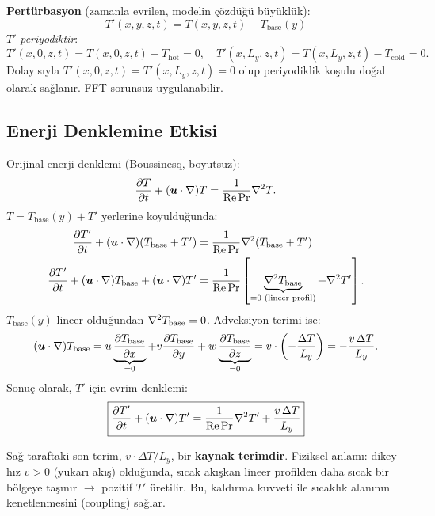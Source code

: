 \textbf{Pertürbasyon} (zamanla evrilen, modelin çözdüğü büyüklük):
\begin{equation}
    T'(x, y, z, t) = T(x, y, z, t) - T_{\text{base}}(y)
    \label{eq:T_perturbation}
\end{equation}
$T'$ \textit{periyodiktir}:
\[
    T'(x, 0, z, t) = T(x, 0, z, t) - T_{\text{hot}} = 0, \quad
    T'(x, L_y, z, t) = T(x, L_y, z, t) - T_{\text{cold}} = 0.
\]
Dolayısıyla $T'(x, 0, z, t) = T'(x, L_y, z, t) = 0$ olup periyodiklik koşulu doğal olarak sağlanır. FFT sorunsuz uygulanabilir.

\subsection{Enerji Denklemine Etkisi}

Orijinal enerji denklemi (Boussinesq, boyutsuz):
\begin{equation}
    \frac{\partial T}{\partial t} + (\bm{u} \cdot \nabla) T = \frac{1}{\mathrm{Re} \, \mathrm{Pr}} \nabla^2 T.
    \label{eq:energy_original}
\end{equation}
$T = T_{\text{base}}(y) + T'$ yerlerine koyulduğunda:
\begin{align}
    \frac{\partial T'}{\partial t} + (\bm{u} \cdot \nabla)(T_{\text{base}} + T')
    &= \frac{1}{\mathrm{Re} \, \mathrm{Pr}} \nabla^2 (T_{\text{base}} + T') \notag \\
    \frac{\partial T'}{\partial t} + (\bm{u} \cdot \nabla) T_{\text{base}} + (\bm{u} \cdot \nabla) T'
    &= \frac{1}{\mathrm{Re} \, \mathrm{Pr}} \left[ \underbrace{\nabla^2 T_{\text{base}}}_{=0 \text{ (lineer profil)}} + \nabla^2 T' \right]. \notag
\end{align}
$T_{\text{base}}(y)$ lineer olduğundan $\nabla^2 T_{\text{base}} = 0$. Adveksiyon terimi ise:
\begin{equation}
    (\bm{u} \cdot \nabla) T_{\text{base}}
    = u \underbrace{\frac{\partial T_{\text{base}}}{\partial x}}_{=0}
    + v \frac{\partial T_{\text{base}}}{\partial y}
    + w \underbrace{\frac{\partial T_{\text{base}}}{\partial z}}_{=0}
    = v \cdot \left(-\frac{\Delta T}{L_y}\right)
    = -\frac{v \, \Delta T}{L_y}.
\end{equation}
Sonuç olarak, $T'$ için evrim denklemi:
\begin{equation}
    \boxed{
        \frac{\partial T'}{\partial t} + (\bm{u} \cdot \nabla) T'
        = \frac{1}{\mathrm{Re} \, \mathrm{Pr}} \nabla^2 T'
        + \frac{v \, \Delta T}{L_y}
    }
    \label{eq:T_prime_equation}
\end{equation}

Sağ taraftaki son terim, $v \cdot \Delta T / L_y$, bir \textbf{kaynak terimdir}. Fiziksel anlamı: dikey hız $v > 0$ (yukarı akış) olduğunda, sıcak akışkan lineer profilden daha sıcak bir bölgeye taşınır $\to$ pozitif $T'$ üretilir. Bu, kaldırma kuvveti ile sıcaklık alanının kenetlenmesini (coupling) sağlar.

